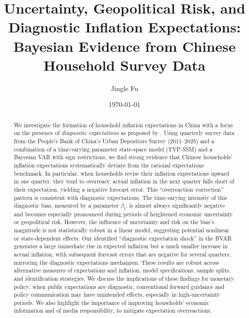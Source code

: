 \documentclass[12pt]{article}
\begin{document}
\title{Uncertainty, Geopolitical Risk, and Diagnostic Inflation Expectations:\\ Bayesian Evidence from Chinese Household Survey Data}
\author{Jingle Fu}
\date{\today}
\maketitle

\begin{abstract}
    We investigate the formation of household inflation expectations in China with a focus on the presence of \textit{diagnostic expectations} as proposed by \cite{Bordalo2018}. Using quarterly survey data from the People's Bank of China's Urban Depositors Survey (2011--2025) and a combination of a time-varying parameter state-space model (TVP-SSM) and a Bayesian VAR with sign restrictions, we find strong evidence that Chinese households' inflation expectations systematically deviate from the rational expectations benchmark. In particular, when households revise their inflation expectations upward in one quarter, they tend to overreact: actual inflation in the next quarter falls short of their expectation, yielding a negative forecast error. This “overreaction--correction” pattern is consistent with diagnostic expectations. The time-varying intensity of this diagnostic bias, measured by a parameter $\beta_t$, is almost always significantly negative and becomes especially pronounced during periods of heightened economic uncertainty or geopolitical risk. However, the influence of uncertainty and risk on the bias's magnitude is not statistically robust in a linear model, suggesting potential nonlinear or state-dependent effects. Our identified “diagnostic expectation shock” in the BVAR generates a large immediate rise in expected inflation but a much smaller increase in actual inflation, with subsequent forecast errors that are negative for several quarters, mirroring the diagnostic expectations mechanism. These results are robust across alternative measures of expectations and inflation, model specifications, sample splits, and identification strategies. We discuss the implications of these findings for monetary policy: when public expectations are diagnostic, conventional forward guidance and policy communication may have unintended effects, especially in high-uncertainty periods. We also highlight the importance of improving households' economic information and of media responsibility, to mitigate expectation overreactions.
\end{abstract}
\end{document}
